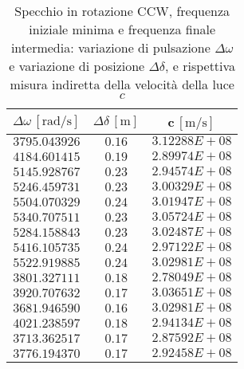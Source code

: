 \documentclass[]{article}
\begin{document}
\begin{table}
    \centering

\begin{tabular}{||c|c|c||}
\hline
$\Delta\omega\, [\text{rad/s}] $ & $\Delta\delta\, [\text{m}] $ & $ $c$\, [\text{m/s}] $ \\
\hline\hline
$3795.043926$ & $0.16 $ & $3.12288E+08$ \\\hline
$4184.601415$ & $0.19 $ & $2.89974E+08$ \\\hline
$5145.928767$ & $0.23 $ & $2.94574E+08$ \\\hline
$5246.459731$ & $0.23 $ & $3.00329E+08$ \\\hline
$5504.070329$ & $0.24 $ & $3.01947E+08$ \\\hline
$5340.707511$ & $0.23 $ & $3.05724E+08$ \\\hline
$5284.158843$ & $0.23 $ & $3.02487E+08$ \\\hline
$5416.105735$ & $0.24 $ & $2.97122E+08$ \\\hline
$5522.919885$ & $0.24 $ & $3.02981E+08$ \\\hline
$3801.327111$ & $0.18 $ & $2.78049E+08$ \\\hline
$3920.707632$ & $0.17 $ & $3.03651E+08$ \\\hline
$3681.946590$ & $0.16 $ & $3.02981E+08$ \\\hline
$4021.238597$ & $0.18 $ & $2.94134E+08$ \\\hline
$3713.362517$ & $0.17 $ & $2.87592E+08$ \\\hline
$3776.194370$ & $0.17 $ & $2.92458E+08$ \\\hline

    \end{tabular}

\caption{Specchio in rotazione CCW, frequenza iniziale minima e frequenza finale intermedia: variazione di pulsazione $\Delta\omega$ e variazione di posizione $\Delta\delta$, e rispettiva misura indiretta della velocità della luce $c$}

\label{CCW_min_mid.csv}

\end{table}
\end{document}
